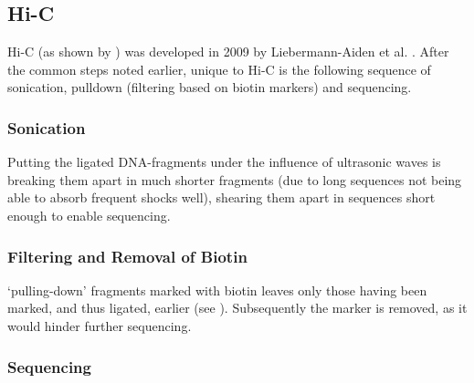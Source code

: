 





\subsection{Hi-C}\label{sec:HiC}

Hi-C (as shown by ) was developed in 2009 by Liebermann-Aiden et al.
\cite{lieberman2009comprehensive}. After the common steps noted earlier, unique
to Hi-C is the following sequence of sonication, pulldown (filtering based on
biotin markers) and sequencing.

\subsubsection{Sonication}\label{sec:sonication}

Putting the ligated DNA-fragments under the influence of ultrasonic waves is
breaking them apart in much shorter fragments (due to long sequences not being
able to absorb frequent shocks well), shearing them apart in sequences short
enough to enable sequencing.

\subsubsection{Filtering and Removal of Biotin}\label{sec:pulldown}

`pulling-down' fragments marked with biotin leaves only those having been
marked, and thus ligated, earlier (see ). Subsequently the
marker is removed, as it would hinder further sequencing.

\subsubsection{Sequencing}\label{sec:sequencing}

